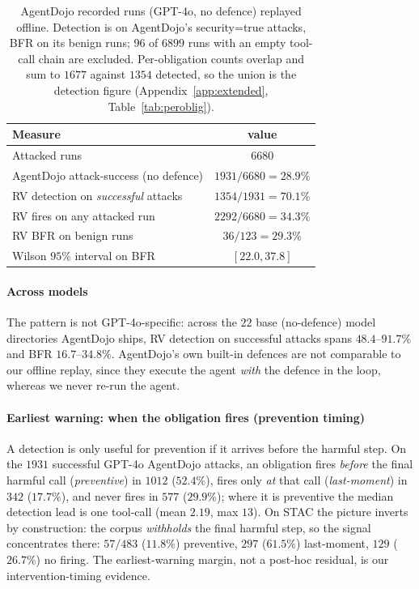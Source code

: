 \documentclass[sigconf]{acmart}
\begin{document}
\begin{table}[t]
\centering
\caption{AgentDojo recorded runs (GPT-4o, no defence) replayed offline. Detection is on
AgentDojo's \textsf{security}=true attacks, BFR on its benign runs; $96$ of $6899$ runs
with an empty tool-call chain are excluded. Per-obligation counts overlap and sum to
$1677$ against $1354$ detected, so the union is the detection figure
(Appendix~\ref{app:extended}, Table~\ref{tab:peroblig}).}
\label{tab:agentdojo}
\renewcommand{\arraystretch}{1.1}
\setlength{\tabcolsep}{5pt}
\begin{tabular}{lc}
\toprule
Measure & value \\
\midrule
Attacked runs                                  & $6680$ \\
AgentDojo attack-success (no defence)          & $1931/6680 = 28.9\%$ \\
RV detection on \emph{successful} attacks       & $1354/1931 = 70.1\%$ \\
RV fires on any attacked run                     & $2292/6680 = 34.3\%$ \\
RV BFR on benign runs                     & $36/123 = 29.3\%$ \\
\quad Wilson $95\%$ interval on BFR             & $[22.0,37.8]$ \\
\bottomrule
\end{tabular}
\end{table}

\paragraph{Across models} The pattern is not GPT-4o-specific: across the
$22$ base (no-defence) model directories AgentDojo ships, RV detection on successful
attacks spans $48.4$--$91.7\%$ and BFR $16.7$--$34.8\%$. AgentDojo's own built-in
defences are not comparable to our offline replay, since they execute the agent
\emph{with} the defence in the loop, whereas we never re-run the agent.

\paragraph{Earliest warning: when the obligation fires (prevention timing)} A
detection is only useful for prevention if it arrives before the harmful step. On the
$1931$ successful GPT-4o AgentDojo attacks, an obligation fires \emph{before} the
final harmful call (\emph{preventive}) in $1012$ ($52.4\%$), fires only \emph{at} that
call (\emph{last-moment}) in $342$ ($17.7\%$), and never fires in $577$ ($29.9\%$);
where it is preventive the median detection lead is one tool-call (mean $2.19$, max
$13$). On STAC the picture inverts by construction: the corpus \emph{withholds} the
final harmful step, so the signal concentrates there: $57/483$ ($11.8\%$) preventive,
$297$ ($61.5\%$) last-moment, $129$ ($26.7\%$) no firing. The earliest-warning margin,
not a post-hoc residual, is our intervention-timing evidence.
\end{document}
